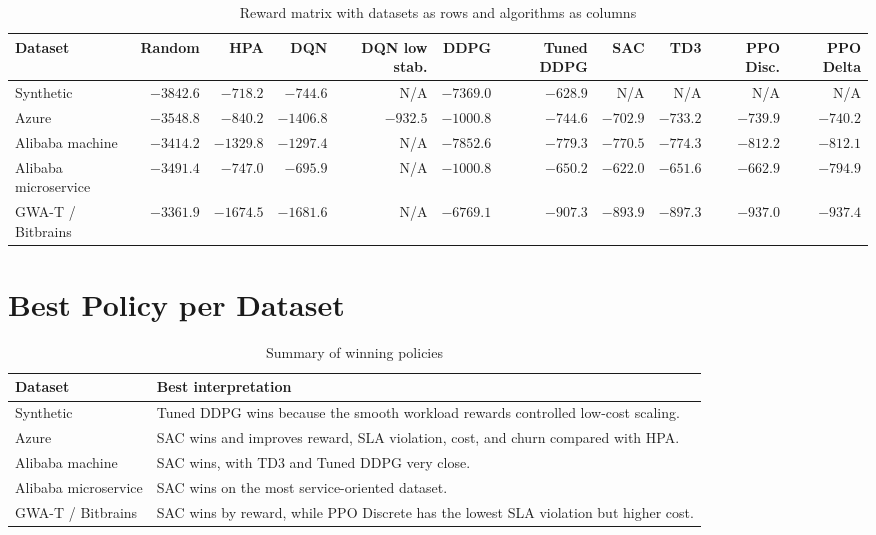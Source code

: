 \documentclass{rapportINPTCLOUD}
\newcommand{\best}[1]{\textbf{#1}}
\begin{document}
\begin{table}[H]
\centering
\scriptsize
\begin{tabular}{lrrrrrrrrrr}
\toprule
\textbf{Dataset} & \textbf{Random} & \textbf{HPA} & \textbf{DQN} & \textbf{DQN low stab.} & \textbf{DDPG} & \textbf{Tuned DDPG} & \textbf{SAC} & \textbf{TD3} & \textbf{PPO Disc.} & \textbf{PPO Delta} \\
\midrule
Synthetic & $-3842.6$ & $-718.2$ & $-744.6$ & N/A & $-7369.0$ & \best{$-628.9$} & N/A & N/A & N/A & N/A \\
Azure & $-3548.8$ & $-840.2$ & $-1406.8$ & $-932.5$ & $-1000.8$ & $-744.6$ & \best{$-702.9$} & $-733.2$ & $-739.9$ & $-740.2$ \\
Alibaba machine & $-3414.2$ & $-1329.8$ & $-1297.4$ & N/A & $-7852.6$ & $-779.3$ & \best{$-770.5$} & $-774.3$ & $-812.2$ & $-812.1$ \\
Alibaba microservice & $-3491.4$ & $-747.0$ & $-695.9$ & N/A & $-1000.8$ & $-650.2$ & \best{$-622.0$} & $-651.6$ & $-662.9$ & $-794.9$ \\
GWA-T / Bitbrains & $-3361.9$ & $-1674.5$ & $-1681.6$ & N/A & $-6769.1$ & $-907.3$ & \best{$-893.9$} & $-897.3$ & $-937.0$ & $-937.4$ \\
\bottomrule
\end{tabular}
\caption{Reward matrix with datasets as rows and algorithms as columns}
\label{tab:reward-matrix}
\end{table}

\section{Best Policy per Dataset}

\begin{table}[H]
\centering
\begin{tabularx}{\textwidth}{lY}
\toprule
\textbf{Dataset} & \textbf{Best interpretation} \\
\midrule
Synthetic & Tuned DDPG wins because the smooth workload rewards controlled low-cost scaling. \\
Azure & SAC wins and improves reward, SLA violation, cost, and churn compared with HPA. \\
Alibaba machine & SAC wins, with TD3 and Tuned DDPG very close. \\
Alibaba microservice & SAC wins on the most service-oriented dataset. \\
GWA-T / Bitbrains & SAC wins by reward, while PPO Discrete has the lowest SLA violation but higher cost. \\
\bottomrule
\end{tabularx}
\caption{Summary of winning policies}
\label{tab:winners}
\end{table}
\end{document}
